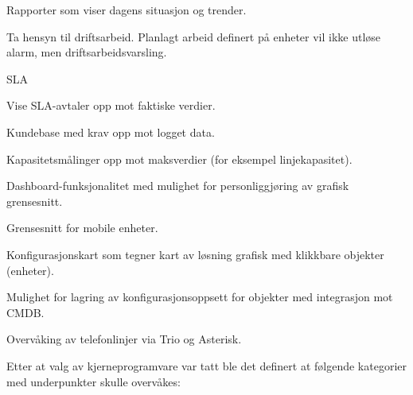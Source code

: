 \begin{itemize*}
	\item Rapporter som viser dagens situasjon og trender.
	\item Ta hensyn til driftsarbeid. Planlagt arbeid definert på enheter vil ikke utløse alarm, men driftsarbeidsvarsling.
	\item SLA
	\begin{itemize*}
		\item Vise SLA-avtaler opp mot faktiske verdier.
		\item Kundebase med krav opp mot logget data.
		\item Kapasitetsmålinger opp mot maksverdier (for eksempel linjekapasitet).
	\end{itemize*}
	\item Dashboard-funksjonalitet med mulighet for personliggjøring av grafisk grensesnitt.
	\item Grensesnitt for mobile enheter.
	\item Konfigurasjonskart som tegner kart av løsning grafisk med klikkbare objekter (enheter).
	\item Mulighet for lagring av konfigurasjonsoppsett for objekter med integrasjon mot CMDB.
	\item Overvåking av telefonlinjer via Trio og Asterisk.
\end{itemize*}

Etter at valg av kjerneprogramvare var tatt ble det definert at følgende kategorier med underpunkter skulle overvåkes:

